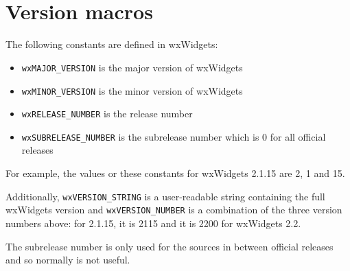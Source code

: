 \\
\\
\\
\\
\\
\\
\\
\\
\\
\\
\\
\\



\section{Version macros}\label{versionfunctions}

The following constants are defined in wxWidgets:

\begin{itemize}\itemsep=0pt
\item {\tt wxMAJOR\_VERSION} is the major version of wxWidgets
\item {\tt wxMINOR\_VERSION} is the minor version of wxWidgets
\item {\tt wxRELEASE\_NUMBER} is the release number
\item {\tt wxSUBRELEASE\_NUMBER} is the subrelease number which is $0$ for all
official releases
\end{itemize}

For example, the values or these constants for wxWidgets 2.1.15 are 2, 1 and
15.

Additionally, {\tt wxVERSION\_STRING} is a user-readable string containing
the full wxWidgets version and {\tt wxVERSION\_NUMBER} is a combination of the
three version numbers above: for 2.1.15, it is 2115 and it is 2200 for
wxWidgets 2.2.

The subrelease number is only used for the sources in between official releases
and so normally is not useful.


